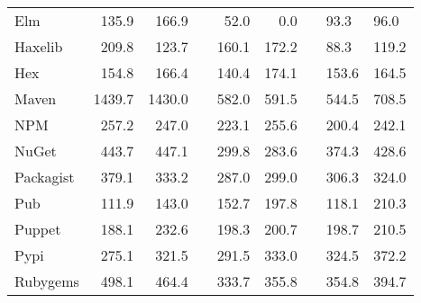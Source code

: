 \begin{tabular}{|l|rr|rr|rr|}
Elm & 135.9 & 166.9 & & 52.0 & 0.0 & & 93.3 & 96.0 & \\
Haxelib & 209.8 & 123.7 & & 160.1 & 172.2 & & 88.3 & 119.2 & \\
Hex & 154.8 & 166.4 & & 140.4 & 174.1 & & 153.6 & 164.5 & \\
Maven & 1439.7 & 1430.0 & & 582.0 & 591.5 & & 544.5 & 708.5 & \\
NPM & 257.2 & 247.0 & & 223.1 & 255.6 & & 200.4 & 242.1 & \\
NuGet & 443.7 & 447.1 & & 299.8 & 283.6 & & 374.3 & 428.6 & \\
Packagist & 379.1 & 333.2 & & 287.0 & 299.0 & & 306.3 & 324.0 & \\
Pub & 111.9 & 143.0 & & 152.7 & 197.8 & & 118.1 & 210.3 & \\
Puppet & 188.1 & 232.6 & & 198.3 & 200.7 & & 198.7 & 210.5 & \\
Pypi & 275.1 & 321.5 & & 291.5 & 333.0 & & 324.5 & 372.2 & \\
Rubygems & 498.1 & 464.4 & & 333.7 & 355.8 & & 354.8 & 394.7 & \\
\hline
\end{tabular}
